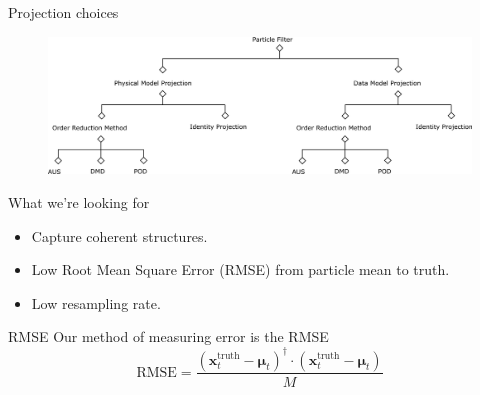 \documentclass[aspectratio=169]{beamer}
\newcommand{\state}{\boldsymbol{x}}
\begin{document}
\begin{frame}{Projection choices}
\vfill
    \begin{figure}[H]
        \centering
        \includegraphics[width=\textwidth]{figures/decision_tree.png}
    \end{figure}
\vfill
\end{frame}


\begin{frame}{What we're looking for}
\vfill
    \begin{itemize}
    \pause
        \item Capture coherent structures.
    \pause
        \item Low Root Mean Square Error (RMSE) from particle mean to truth.
    \pause
        \item Low resampling rate.
    \end{itemize}
\vfill
\end{frame}


\begin{frame}{RMSE}
\vfill
Our method of measuring error is the RMSE
\[
\textrm{RMSE} = \frac{(\state_t^{\textrm{truth}}-\boldsymbol{\mu}_t)^\dagger \cdot (\state_t^{\textrm{truth}}-\boldsymbol{\mu}_t)}{M}
\]
\vfill
\end{frame}

\end{document}
